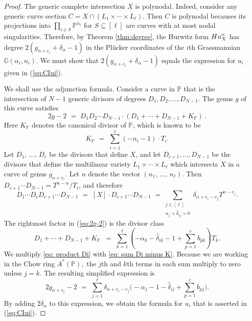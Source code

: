 \documentclass[10pt,a4paper]{amsart}
\newcommand{\bG}{\mathbb G}
\newcommand{\bP}{\mathbb P}
\begin{document}
\begin{proof}
The generic complete intersection $X$ is polynodal. Indeed, 
consider any  generic curve section $C = X \cap (L_1 \times \cdots \times L_\ell)$.
Then $C$ is polynodal becauses its projections into $\prod_{i \in S} \bP^{n_i}$ for $S \subseteq [\ell]$
are curves with at most nodal singularities. Therefore,  by Theorem \ref{thm:degree}, the Hurwitz form
${\rm Hu}_X^\alpha$ has degree $2 (g_{\alpha+e_i}+\delta_\alpha - 1) $
in the Pl\"ucker coordinates of the $i$th Grassmannian
$\bG(\alpha_i,n_i)$. We must show that
$2 (g_{\alpha+e_i}+\delta_\alpha - 1) $ equals
the expression for $u_i$ given in (\ref{eq:CIui}).

We shall use the adjunction formula.
Consider a curve in $\bP$ that is the intersection of
$N-1$ generic divisors of degrees $D_1,D_2,\ldots,D_{N-1}$.
The genus $g$ of this curve satisfies
\begin{equation}
\label{eq:2g-2}
  2g -2 \,\,= \,\,D_1 D_2 \cdots D_{N-1} \cdot (D_1+\cdots+D_{N-1}+K_{\bP})\,. 
  \end{equation}
Here $K_\bP$ denotes the canonical divisor of $\bP $, which is known to be
$$ K_{\bP} \,\, = \,\, \sum_{i=1}^\ell (-n_i-1) \cdot T_i . $$
 Let $D_1, \, \ldots, \, D_c$ be the divisors that define $X$, and 
 let $D_{c+1},\ldots,D_{N-1}$ be the divisors that define
 the multilinear variety $L_1 \times\cdots \times L_\ell$ which intersects $X$
  in a curve of genus $g_{\alpha+e_i}$.
  Let $n$ denote the vector $(n_1, \, \ldots, \, n_\ell)$.
  Then $D_{c+1} \cdots D_{N-1} = T^{n-\alpha}/T_i$, and therefore
      \begin{equation}\label{eq: product Di}
        D_1 \cdots D_c D_{c+1}\cdots D_{N-1} \,\,=\,\,         [X] \cdot D_{c+1} \cdots D_{N-1} \,\,
         = \sum_{\substack{j\in[\ell]\\\alpha_j+\hat{\delta}_{ij}>0}} \delta_{\alpha + e_i - e_j}T^{n - e_j}.
    \end{equation}
The rightmost factor in (\ref{eq:2g-2}) is the divisor class
\begin{equation}\label{eq: sum Di minus K}
  D_1+\cdots+D_{N-1}+K_{\bP}\, \,\,= \,\,\sum_{k=1}^\ell\left(-\alpha_k-\hat{\delta}_{ik}-1+\sum_{p=1}^c b_{pk}\right)T_k.
 \end{equation}
    We multiply \eqref{eq: product Di} with \eqref{eq: sum Di minus K}. Because we are working in the Chow ring $A^*(\bP),$ the $j$th and $k$th terms in each sum multiply to zero unless $j=k.$ The 
    resulting simplified expression is
    $$
        2g_{\alpha + e_i} -2 \,\,= \,\,
        \sum_{j=1}^\ell \delta_{\alpha + e_i - e_j} \biggl(- \alpha_j - 1 - \hat{\delta}_{ij} + \sum_{p=1}^c b_{pj} \biggr).
$$
    By adding $2 \delta_\alpha$ to this expression, we obtain the
    formula for $u_i$ that is asserted in (\ref{eq:CIui}).
\end{proof}
\end{document}

